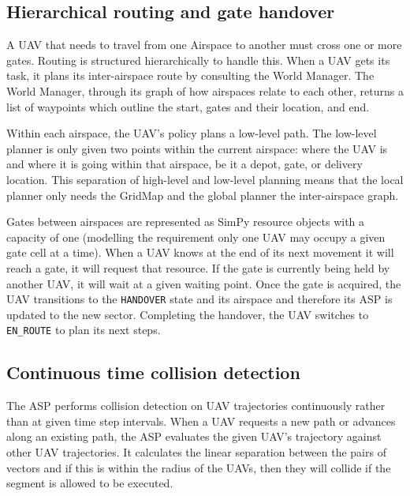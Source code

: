 \vspace{1em}

\subsection{Hierarchical routing and gate handover}

A UAV that needs to travel from one Airspace to another must cross one or more gates. Routing is structured hierarchically to handle this. When a UAV gets its task, it plans its inter-airspace route by consulting the World Manager. The World Manager, through its graph of how airspaces relate to each other, returns a list of waypoints which outline the start, gates and their location, and end.\par

\vspace{1em}

Within each airspace, the UAV's policy plans a low-level path. The low-level planner is only given two points within the current airspace: where the UAV is and where it is going within that airspace, be it a depot, gate, or delivery location. This separation of high-level and low-level planning means that the local planner only needs the GridMap and the global planner the inter-airspace graph. \par

\vspace{1em}

Gates between airspaces are represented as SimPy resource objects with a capacity of one (modelling the requirement only one UAV may occupy a given gate cell at a time). When a UAV knows at the end of its next movement it will reach a gate, it will request that resource. If the gate is currently being held by another UAV, it will wait at a given waiting point. Once the gate is acquired, the UAV transitions to the \texttt{HANDOVER} state and its airspace and therefore its ASP is updated to the new sector. Completing the handover, the UAV switches to \texttt{EN\_ROUTE} to plan its next steps. \par

\vspace{1em}

\subsection{Continuous time collision detection}

The ASP performs collision detection on UAV trajectories continuously rather than at given time step intervals. When a UAV requests a new path or advances along an existing path, the ASP evaluates the given UAV's trajectory against other UAV trajectories. It calculates the linear separation between the pairs of vectors and if this is within the radius of the UAVs, then they will collide if the segment is allowed to be executed. \par

